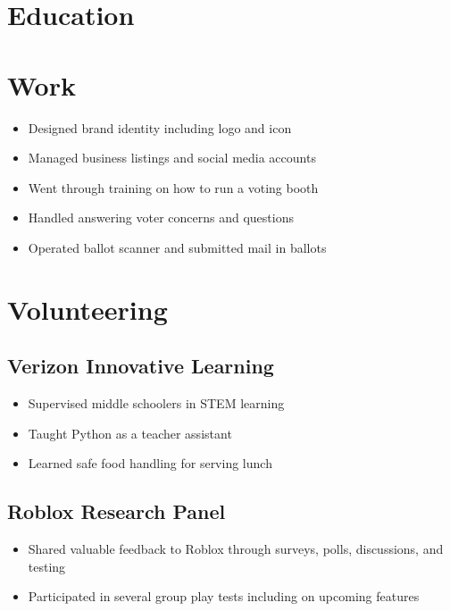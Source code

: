 \documentclass{my_cv} %
\begin{document}

\section{Education}

\section{Work}
\begin{itemize}
    \item Designed brand identity including logo and icon
    \item Managed business listings and social media accounts
\end{itemize}

\begin{itemize}
    \item Went through training on how to run a voting booth
    \item Handled answering voter concerns and questions
    \item Operated ballot scanner and submitted mail in ballots
\end{itemize}

\section{Volunteering}
\subsection{Verizon Innovative Learning}
\begin{itemize}
    \item Supervised middle schoolers in STEM learning
    \item Taught Python as a teacher assistant
    \item Learned safe food handling for serving lunch
\end{itemize}

\subsection{Roblox Research Panel}
\begin{itemize}
    \item Shared valuable feedback to Roblox through surveys, polls, discussions, and testing
    \item Participated in several group play tests including on upcoming features
\end{itemize}
\end{document}
